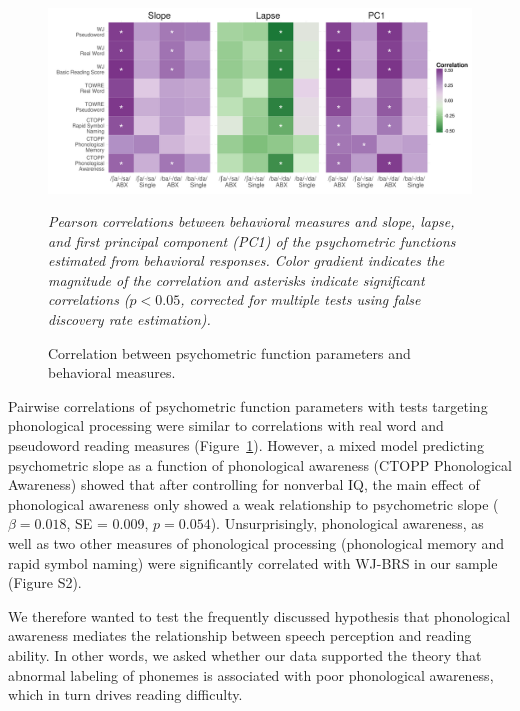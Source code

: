 \documentclass[../uwthesis.tex]{subfiles}
\begin{document}
\begin{figure}
    \centering
    \caption{Correlation between psychometric function parameters and behavioral measures.}
    \label{fig:f}
    \includegraphics[width = 18 cm]{images/paper_1/pairwise_corr.png}
    \item \textit{Pearson correlations between behavioral measures and slope, lapse, and first principal component (PC1) of the psychometric functions estimated from behavioral responses. Color gradient indicates the magnitude of the correlation and asterisks indicate significant correlations ($p<0.05$, corrected for multiple tests using false discovery rate estimation).}
\end{figure}

Pairwise correlations of psychometric function parameters with tests targeting phonological processing were similar to correlations with real word and pseudoword reading measures (Figure~\ref{fig:f}). However, a mixed model predicting psychometric slope as a function of phonological awareness (CTOPP Phonological Awareness) showed that after controlling for nonverbal IQ, the main effect of phonological awareness only showed a weak relationship to psychometric slope ($\beta= 0.018$, SE = 0.009, $p = 0.054$). Unsurprisingly, phonological awareness, as well as two other measures of phonological processing (phonological memory and rapid symbol naming) were significantly correlated with WJ-BRS in our sample (Figure S2).
 
We therefore wanted to test the frequently discussed hypothesis that phonological awareness mediates the relationship between speech perception and reading ability. In other words, we asked whether our data supported the theory that abnormal labeling of phonemes is associated with poor phonological awareness, which in turn drives reading difficulty. 
\end{document}
